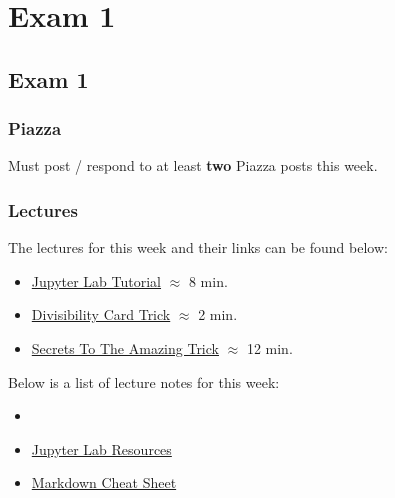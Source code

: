 \clearpage

\renewcommand{\ChapTitle}{Exam 1}
\renewcommand{\SectionTitle}{Exam 1}

\chapter{\ChapTitle}
\section{\SectionTitle}

\subsection{Piazza}

Must post / respond to at least \textbf{two} Piazza posts this week.

\subsection{Lectures}

The lectures for this week and their links can be found below:

\begin{itemize}
    \item \href{https://applied.cs.colorado.edu/mod/hvp/view.php?id=51653}{Jupyter Lab Tutorial} $\approx$ 8 min.
    \item \href{https://www.youtube.com/watch?v=7zX7bZl4SLY}{Divisibility Card Trick} $\approx$ 2 min.
    \item \href{https://www.youtube.com/watch?v=5E3SIbS_uLU}{Secrets To The Amazing Trick} $\approx$ 12 min.
\end{itemize}

\noindent Below is a list of lecture notes for this week:

\begin{itemize}
    \item {}
    \item \href{https://www.colorado.edu/cs/students/computing-resources-students}{Jupyter Lab Resources}
    \item \href{https://github.com/adam-p/markdown-here/wiki/Markdown-Cheatsheet}{Markdown Cheat Sheet}
\end{itemize}
